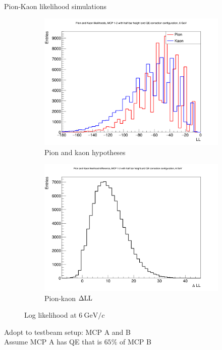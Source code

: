 \documentclass{beamer}
\begin{document}
\begin{frame}{Pion-Kaon likelihood simulations}
  \begin{figure}
    \centering
    \vspace{-0.2cm}
    \begin{subfigure}{0.5\textwidth}
      \includegraphics[width = 1.0\textwidth]{Plots/PionKaonLL6GeVStandardMCPAB.png}
      \caption{Pion and kaon hypotheses}
    \end{subfigure}%
    \begin{subfigure}{0.5\textwidth}
      \includegraphics[width = 1.0\textwidth]{Plots/PionKaonDLL6GeVStandardMCPAB.png}
      \caption{Pion-kaon $\Delta{\rm LL}$}
    \end{subfigure}
    \caption{Log likelihood at $\SI{6}{\giga\eV/c}$}
  \end{figure}
  \begin{center}
    Adopt to testbeam setup: MCP A and B\\
    Assume MCP A has QE that is $65\%$ of MCP B
  \end{center}
\end{frame}
\end{document}
